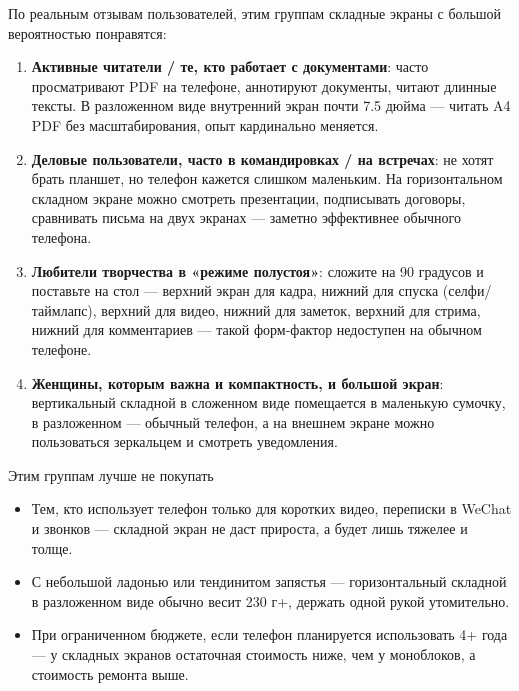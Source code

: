 По реальным отзывам пользователей, этим группам складные экраны с большой вероятностью понравятся:

\begin{enumerate}
  \item \textbf{Активные читатели / те, кто работает с документами}: часто просматривают PDF на телефоне, аннотируют документы, читают длинные тексты. В разложенном виде внутренний экран почти 7.5 дюйма — читать A4 PDF без масштабирования, опыт кардинально меняется.
  \item \textbf{Деловые пользователи, часто в командировках / на встречах}: не хотят брать планшет, но телефон кажется слишком маленьким. На горизонтальном складном экране можно смотреть презентации, подписывать договоры, сравнивать письма на двух экранах — заметно эффективнее обычного телефона.
  \item \textbf{Любители творчества в «режиме полустоя»}: сложите на 90 градусов и поставьте на стол — верхний экран для кадра, нижний для спуска (селфи/таймлапс), верхний для видео, нижний для заметок, верхний для стрима, нижний для комментариев — такой форм-фактор недоступен на обычном телефоне.
  \item \textbf{Женщины, которым важна и компактность, и большой экран}: вертикальный складной в сложенном виде помещается в маленькую сумочку, в разложенном — обычный телефон, а на внешнем экране можно пользоваться зеркальцем и смотреть уведомления.
\end{enumerate}

\begin{tcbwarn}{Этим группам лучше не покупать}
\begin{itemize}
  \item Тем, кто использует телефон только для коротких видео, переписки в WeChat и звонков — складной экран не даст прироста, а будет лишь тяжелее и толще.
  \item С небольшой ладонью или тендинитом запястья — горизонтальный складной в разложенном виде обычно весит 230 г+, держать одной рукой утомительно.
  \item При ограниченном бюджете, если телефон планируется использовать 4+ года — у складных экранов остаточная стоимость ниже, чем у моноблоков, а стоимость ремонта выше.
\end{itemize}

\end{tcbwarn}


